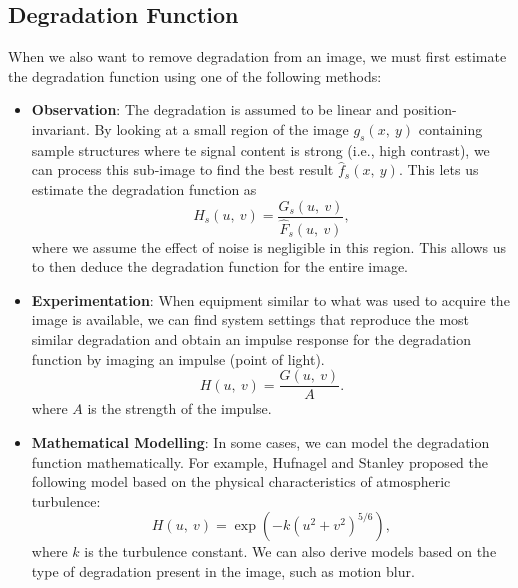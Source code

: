 \documentclass{article}
\begin{document}
\subsection{Degradation Function}
When we also want to remove degradation from an image, we must first
estimate the degradation function using one of the following methods:
\begin{itemize}
    \item \textbf{Observation}: The degradation is assumed to be linear
          and position-invariant. By looking at a small region of the image
          \(g_s\left( x,\: y \right)\) containing sample structures where
          te signal content is strong (i.e., high contrast), we can process
          this sub-image to find the best result \(\hat{f}_s\left( x,\: y \right)\).
          This lets us estimate the degradation function as
          \begin{equation*}
              H_s\left( u,\: v \right) = \frac{G_s\left( u,\: v \right)}{\hat{F}_s\left( u,\: v \right)},
          \end{equation*}
          where we assume the effect of noise is negligible in this region.
          This allows us to then deduce the degradation function for the
          entire image.
    \item \textbf{Experimentation}: When equipment similar to what was
          used to acquire the image is available, we can find system settings
          that reproduce the most similar degradation and obtain an impulse
          response for the degradation function by imaging an impulse (point
          of light).
          \begin{equation*}
              H\left( u,\: v \right) = \frac{G\left( u,\: v \right)}{A}.
          \end{equation*}
          where \(A\) is the strength of the impulse.
    \item \textbf{Mathematical Modelling}: In some cases, we can model
          the degradation function mathematically. For example, Hufnagel and
          Stanley proposed the following model based on the physical
          characteristics of atmospheric turbulence:
          \begin{equation*}
              H\left( u,\: v \right) = \exp\left( -k \left( u^2 + v^2 \right)^{5/6} \right),
          \end{equation*}
          where \(k\) is the turbulence constant. We can also derive models
          based on the type of degradation present in the image, such as
          motion blur.

\end{itemize}
\end{document}
